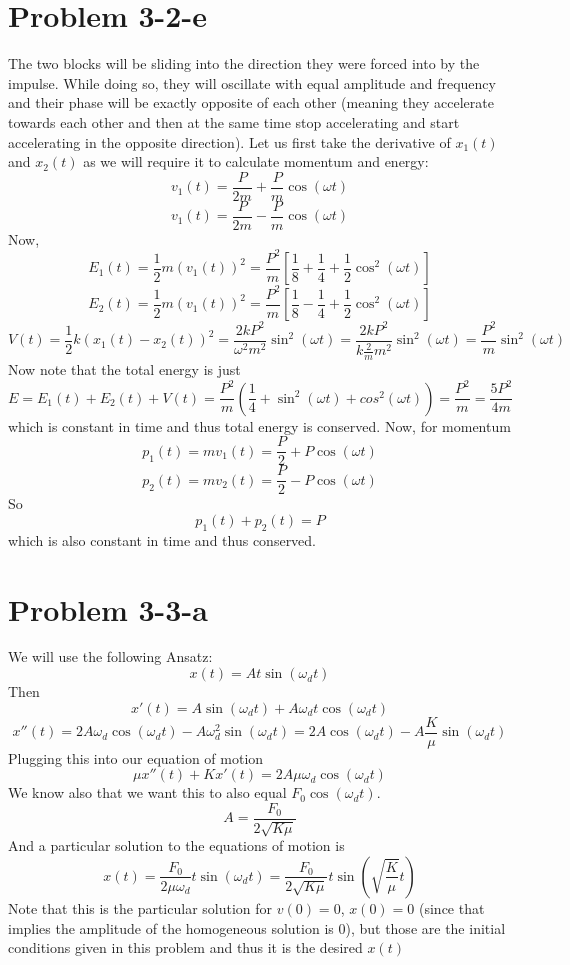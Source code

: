 \section*{Problem 3-2-e}
The two blocks will be sliding into the direction they were forced into by the impulse. While doing so, they will oscillate with equal amplitude and frequency and their phase will be exactly opposite of each other (meaning they accelerate towards each other and then at the same time stop accelerating and start accelerating in the opposite direction).
Let us first take the derivative of $x_1(t)$ and $x_2(t)$ as we will require it to calculate momentum and energy:
\[ v_1(t) = \frac{P}{2m} + \frac{P}{m}\cos(\omega t) \]
\[ v_1(t) = \frac{P}{2m} - \frac{P}{m}\cos(\omega t) \]
Now,
\[ E_1(t) = \frac{1}{2}m(v_1(t))^2  = \frac{P^2}{m}\left[\frac{1}{8}+\frac{1}{4}+\frac{1}{2}\cos^2(\omega t)\right] \]
\[ E_2(t) = \frac{1}{2}m(v_1(t))^2  = \frac{P^2}{m}\left[\frac{1}{8}-\frac{1}{4}+\frac{1}{2}\cos^2(\omega t)\right] \]
\[ V(t) = \frac{1}{2}k(x_1(t)-x_2(t))^2 = \frac{2k P^2}{\omega^2 m^2} \sin^2(\omega t) = \frac{2k P^2}{k \frac{2}{m} m^2} \sin^2(\omega t) = \frac{P^2}{m}\sin^2(\omega t)  \]
Now note that the total energy is just
\[ E = E_1(t)+ E_2(t) + V(t) = \frac{P^2}{m}\left(\frac{1}{4}+\sin^2(\omega t) + cos^2(\omega t)\right) = \frac{P^2}{m} = \frac{5P^2}{4m} \]
which is constant in time and thus total energy is conserved. 
Now, for momentum 
\[ p_1(t) = mv_1(t) = \frac{P}{2}+P\cos(\omega t) \]
\[ p_2(t) = mv_2(t) = \frac{P}{2}-P\cos(\omega t) \]
So 
\[ p_1(t) + p_2(t) = P \]
which is also constant in time and thus conserved.
\section*{Problem 3-3-a}
We will use the following Ansatz:
\[ x(t) = A t\sin(\omega_d t) \]
Then 
\[ x'(t) = A\sin(\omega_d t) + A\omega_d t \cos(\omega_d t) \]
\[ x''(t) = 2A\omega_d\cos(\omega_d t) - A\omega_d^2 \sin(\omega_d t)  =  2A\cos(\omega_d t) - A\frac{K}{\mu}\sin(\omega_d t)  \]
Plugging this into our equation of motion 
\[ \mu x''(t)+Kx'(t) = 2A\mu\omega_d\cos(\omega_d t) \]
We know also that we want this to also equal $F_0 \cos(\omega_d t)$.
\[ A =  \frac{F_0}{2\sqrt{K \mu}} \]
And a particular solution to the equations of motion is
\[ x(t) = \frac{F_0}{2\mu\omega_d} t\sin(\omega_d t) = \frac{F_0}{2\sqrt{K \mu}} t \sin\left(\sqrt{\frac{K}{\mu}}  t\right)  \]
Note that this is the particular solution for $v(0)=0$, $x(0)=0$ (since that implies the amplitude of the homogeneous solution is $0$), but those are the initial conditions given in this problem and thus it is the desired $x(t)$
